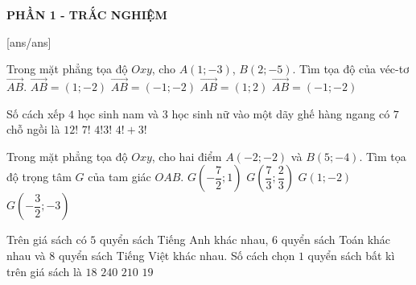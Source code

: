 
\begin{center}
	\textbf{PHẦN 1 - TRẮC NGHIỆM}
\end{center}
[ans/ans]

\begin{ex}%
	Trong mặt phẳng tọa độ $Oxy$, cho $A(1;-3)$, $B(2;-5)$. Tìm tọa độ của véc-tơ $\overrightarrow{AB}$.
	\choice
	{\True $\overrightarrow{AB} = (1;-2)$}
	{$\overrightarrow{AB} = (-1;-2)$}
	{$\overrightarrow{AB} = (1;2)$}
	{$\overrightarrow{AB} = (-1;-2)$}
\end{ex}

\begin{ex}%
	Số cách xếp $4$ học sinh nam và $3$ học sinh nữ vào một dãy ghế hàng ngang có $7$ chỗ ngồi là
	\choice
	{$12!$}
	{\True $7!$}
	{$4!3!$}
	{$4!+3!$}
\end{ex}

\begin{ex}%
	Trong mặt phẳng tọa độ $Oxy$, cho hai điểm $A(-2;-2)$ và $B(5;-4)$. Tìm tọa độ trọng tâm $G$ của tam giác $OAB$.
	\choice
	{$G\left( -\dfrac{7}{2};1 \right)$}
	{$G\left( \dfrac{7}{3};\dfrac{2}{3} \right)$}
	{\True $G\left( 1;-2 \right)$}
	{$G\left( -\dfrac{3}{2};-3 \right)$}
\end{ex}

\begin{ex}%
	Trên giá sách có $5$ quyển sách Tiếng Anh khác nhau, $6$ quyển sách Toán khác nhau và $8$ quyển sách Tiếng Việt khác nhau. Số cách chọn $1$ quyển sách bất kì trên giá sách là
	\choice
	{$18$}
	{$240$}
	{$210$}
	{\True $19$}
\end{ex}

